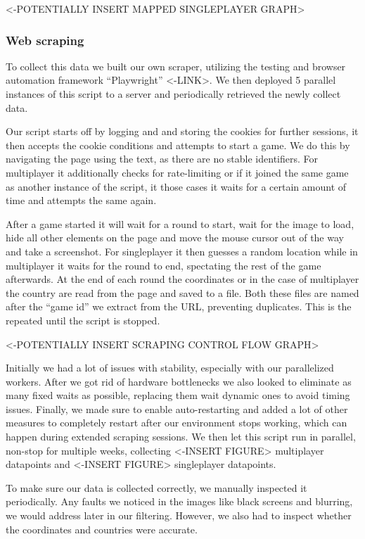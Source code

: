 \documentclass{article}
\begin{document}
\textless-POTENTIALLY INSERT MAPPED SINGLEPLAYER GRAPH\textgreater{}

\subsubsection{Web scraping}\label{web-scraping}

To collect this data we built our own scraper, utilizing the testing and
browser automation framework ``Playwright'' \textless-LINK\textgreater.
We then deployed 5 parallel instances of this script to a server and
periodically retrieved the newly collect data.

Our script starts off by logging and and storing the cookies for further
sessions, it then accepts the cookie conditions and attempts to start a
game. We do this by navigating the page using the text, as there are no
stable identifiers. For multiplayer it additionally checks for
rate-limiting or if it joined the same game as another instance of the
script, it those cases it waits for a certain amount of time and
attempts the same again.

After a game started it will wait for a round to start, wait for the
image to load, hide all other elements on the page and move the mouse
cursor out of the way and take a screenshot. For singleplayer it then
guesses a random location while in multiplayer it waits for the round to
end, spectating the rest of the game afterwards. At the end of each
round the coordinates or in the case of multiplayer the country are read
from the page and saved to a file. Both these files are named after the
``game id'' we extract from the URL, preventing duplicates. This is the
repeated until the script is stopped.

\textless-POTENTIALLY INSERT SCRAPING CONTROL FLOW GRAPH\textgreater{}

Initially we had a lot of issues with stability, especially with our
parallelized workers. After we got rid of hardware bottlenecks we also
looked to eliminate as many fixed waits as possible, replacing them wait
dynamic ones to avoid timing issues. Finally, we made sure to enable
auto-restarting and added a lot of other measures to completely restart
after our environment stops working, which can happen during extended
scraping sessions. We then let this script run in parallel, non-stop for
multiple weeks, collecting \textless-INSERT FIGURE\textgreater{}
multiplayer datapoints and \textless-INSERT FIGURE\textgreater{}
singleplayer datapoints.

To make sure our data is collected correctly, we manually inspected it
periodically. Any faults we noticed in the images like black screens and
blurring, we would address later in our filtering. However, we also had
to inspect whether the coordinates and countries were accurate.
\end{document}
